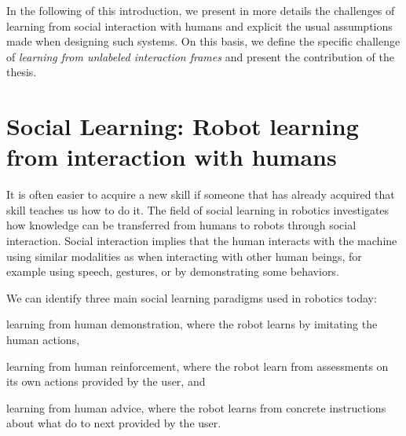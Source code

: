 
In the following of this introduction, we present in more details the challenges of learning from social interaction with humans and explicit the usual assumptions made when designing such systems. On this basis, we define the specific challenge of \emph{learning from unlabeled interaction frames} 
and present the contribution of the thesis.

\section{Social Learning: Robot learning from interaction with humans}
\label{sec:intro:social}

It is often easier to acquire a new skill if someone that has already acquired that skill teaches us how to do it. The field of social learning in robotics investigates how knowledge can be transferred from humans to robots through social interaction. Social interaction implies that the human interacts with the machine using similar modalities as when interacting with other human beings, for example using speech, gestures, or by demonstrating some behaviors.

We can identify three main social learning paradigms used in robotics today: \begin{inparaenum}[(a)] \item learning from human demonstration, where the robot learns by imitating the human actions, \item learning from human reinforcement, where the robot learn from assessments on its own actions provided by the user, and \item learning from human advice, where the robot learns from concrete instructions about what do to next provided by the user. \end{inparaenum}


